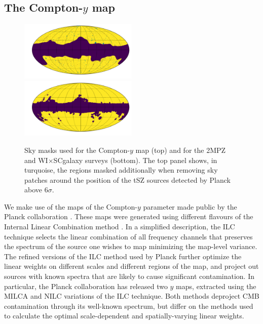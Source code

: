\documentclass[useAMS,usenatbib]{mn2e}
\newcommand{\wisc}{WI$\times$SC}
\begin{document}
  \subsection{The Compton-$y$ map}\label{ssec:data.y}
    \begin{figure}
      \centering
      \includegraphics[width=0.5\textwidth]{mask_y.pdf}
      \includegraphics[width=0.5\textwidth]{mask_g.pdf}
      \caption{Sky masks used for the Compton-$y$ map (top) and for the 2MPZ and \wisc galaxy surveys (bottom). The top panel shows, in turquoise, the regions masked additionally when removing sky patches around the position of the tSZ sources detected by Planck above 6$\sigma$.}
      \label{fig:msk}
    \end{figure}
    We make use of the maps of the Compton-$y$ parameter made public by the Planck collaboration \cite{2016A&A...594A..22P}. These maps were generated using different flavours of the Internal Linear Combination method \cite{2004ApJ...612..633E,2008arXiv0811.4277V}. In a simplified description, the ILC technique selects the linear combination of all frequency channels that preserves the spectrum of the source one wishes to map minimizing the map-level variance. The refined versions of the ILC method used by Planck further optimize the linear weights on different scales and different regions of the map, and project out sources with known spectra that are likely to cause significant contamination. In particular, the Planck collaboration has released two $y$ maps, extracted using the MILCA \citep{2013A&A...558A.118H} and NILC \cite{2011MNRAS.410.2481R} variations of the ILC technique. Both methods deproject CMB contamination through its well-known spectrum, but differ on the methods used to calculate the optimal scale-dependent and spatially-varying linear weights.
    
\end{document}
